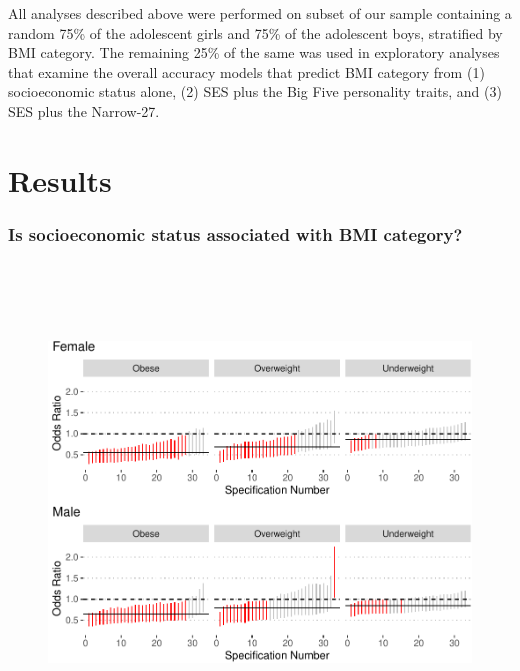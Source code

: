 \documentclass[man]{apa6}
\begin{document}
All analyses described above were performed on subset of our sample containing a random 75\% of the adolescent girls and 75\% of the adolescent boys, stratified by BMI category. The remaining 25\% of the same was used in exploratory analyses that examine the overall accuracy models that predict BMI category from (1) socioeconomic status alone, (2) SES plus the Big Five personality traits, and (3) SES plus the Narrow-27.

\hypertarget{results}{%
\section{Results}\label{results}}

\hypertarget{is-socioeconomic-status-associated-with-bmi-category}{%
\subsubsection{Is socioeconomic status associated with BMI category?}\label{is-socioeconomic-status-associated-with-bmi-category}}

\begin{figure}
\includegraphics[height=5in]{bmi_personality_files/figure-latex/SESplot-1} \caption{ }\label{fig:SESplot}
\end{figure}
\end{document}
